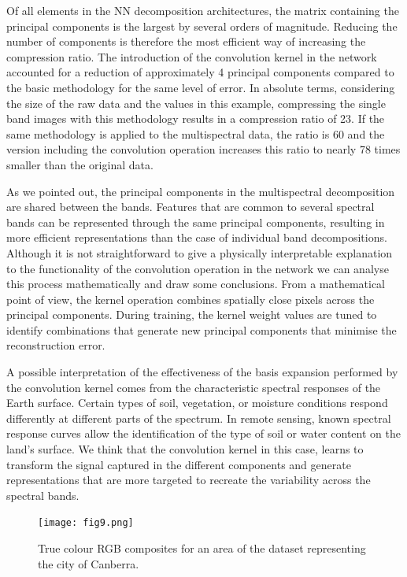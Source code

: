 \documentclass[essd, manuscript]{copernicus}
\begin{document}
Of all elements in the NN decomposition architectures, the matrix containing the principal components is the largest by several orders of magnitude. Reducing the number of components is therefore the most efficient way of increasing the compression ratio. The introduction of the convolution kernel in the network accounted for a reduction of approximately 4 principal components compared to the basic methodology for the same level of error. In absolute terms, considering the size of the raw data and the values in this example, compressing the single band images with this methodology results in a compression ratio of 23. If the same methodology is applied to the multispectral data, the ratio is 60 and the version including the convolution operation increases this ratio to nearly 78 times smaller than the original data.

As we pointed out, the principal components in the multispectral decomposition are shared between the bands. Features that are common to several spectral bands can be represented through the same principal components, resulting in more efficient representations than the case of individual band decompositions. Although it is not straightforward to give a physically interpretable explanation to the functionality of the convolution operation in the network we can analyse this process mathematically and draw some conclusions. From a mathematical point of view, the kernel operation combines spatially close pixels across the principal components. During training, the kernel weight values are tuned to identify combinations that generate new principal components that minimise the reconstruction error. 

A possible interpretation of the effectiveness of the basis expansion performed by the convolution kernel comes from the characteristic spectral responses of the Earth surface. Certain types of soil, vegetation, or moisture conditions respond differently at different parts of the spectrum. In remote sensing, known spectral response curves allow the identification of the type of soil or water content on the land's surface. We think that the convolution kernel in this case, learns to transform the signal captured in the different components and generate representations that are more targeted to recreate the variability across the spectral bands. 

\begin{figure}
    \texttt{[image: fig9.png]}
    \caption{True colour RGB composites for an area of the dataset representing the city of Canberra.}%
    \label{compression_cmp}%
\end{figure}
\end{document}
